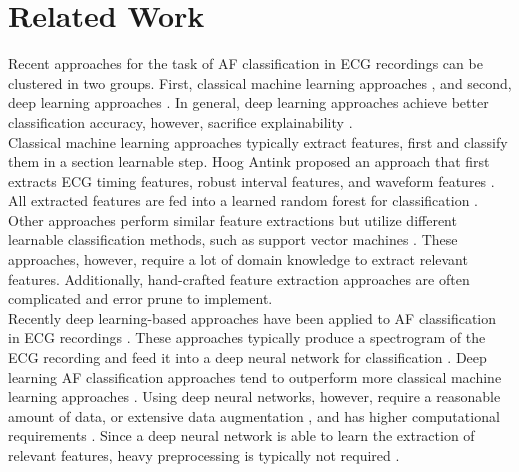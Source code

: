 \section{Related Work} \label{sec:rleated_work}
Recent approaches for the task of AF classification in ECG recordings can be clustered in two groups. First, classical machine learning approaches \cite{Antink2017, Smisek2017}, and second, deep learning approaches \cite{Zihlmann2017, Mousavi2019, Mashrur2019, Khriji2020, Nonaka2020}. In general, deep learning approaches achieve better classification accuracy, however, sacrifice explainability \cite{Goodfellow2016, Zihlmann2017, Samek2018, Mousavi2019}.\\
\indent Classical machine learning approaches typically extract features, first and classify them in a section learnable step. Hoog Antink \etal \cite{Antink2017} proposed an approach that first extracts ECG timing features, robust interval features, and waveform features \cite{Antink2017}. All extracted features are fed into a learned random forest for classification \cite{Antink2017}. Other approaches perform similar feature extractions but utilize different learnable classification methods, such as support vector machines \cite{Smisek2017}. These approaches, however, require a lot of domain knowledge to extract relevant features. Additionally, hand-crafted feature extraction approaches are often complicated and error prune to implement.\\
\indent Recently deep learning-based approaches have been applied to AF classification in ECG recordings \cite{Zihlmann2017, Mousavi2019, Mashrur2019, Khriji2020, Nonaka2020}. These approaches typically produce a spectrogram of the ECG recording and feed it into a deep neural network for classification \cite{Zihlmann2017, Mashrur2019}. Deep learning AF classification approaches tend to outperform more classical machine learning approaches \cite{Mousavi2019, Khriji2020}. Using deep neural networks, however, require a reasonable amount of data, or extensive data augmentation \cite{Perez2017}, and has higher computational requirements \cite{Lecun2015, Goodfellow2016}. Since a deep neural network is able to learn the extraction of relevant features, heavy preprocessing is typically not required \cite{Zihlmann2017, Lecun2015, Goodfellow2016}.